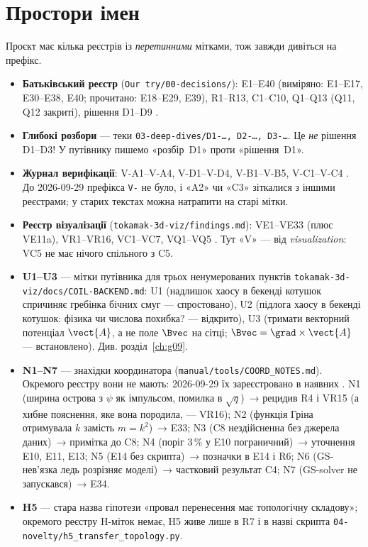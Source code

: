 \section{Простори імен}\label{sec:g00-ids}

Проєкт має кілька реєстрів із \emph{перетинними} мітками, тож завжди дивіться на префікс.
\begin{itemize}
\item \textbf{Батьківський реєстр} (\texttt{Our try/00-decisions/}): E1--E40 (виміряно:
  E1--E17, E30--E38, E40; прочитано: E18--E29, E39), R1--R13, C1--C10, Q1--Q13 (Q11, Q12 закриті),
  рішення D1--D9 \cite{RegEst,RegConj,RegQ,RegDec}.
\item \textbf{Глибокі розбори} --- теки \texttt{03-deep-dives/D1-\ldots, D2-\ldots, D3-\ldots}.
  Це \emph{не} рішення D1--D3! У путівнику пишемо «розбір~D1» проти «рішення~D1».
\item \textbf{Журнал верифікації}: V-A1--V-A4, V-D1--V-D4, V-B1--V-B5, V-C1--V-C4
  \cite{RegVerif}. До 2026-09-29 префікса \texttt{V-} не було, і «A2» чи «C3» зіткалися з
  іншими реєстрами; у старих текстах можна натрапити на старі мітки.
\item \textbf{Реєстр візуалізації} (\texttt{tokamak-3d-viz/\allowbreak findings.md}): VE1--VE33 (плюс
  VE11a), VR1--VR16, VC1--VC7, VQ1--VQ5 \cite{RegViz}. Тут «V» --- від
  \emph{visualization}: VC5 не має нічого спільного з C5.
\item \textbf{U1--U3} --- мітки путівника для трьох ненумерованих пунктів
  \texttt{tokamak-3d-viz/\allowbreak docs/\allowbreak COIL-BACKEND.md}: U1 (надлишок хаосу в
  бекенді котушок спричиняє гребінка бічних смуг --- спростовано), U2 (підлога хаосу в бекенді
  котушок: фізика чи числова похибка? --- відкрито), U3 (тримати векторний потенціал $\vect{A}$, а не поле $\Bvec$ на сітці;
  $\Bvec=\grad\times\vect{A}$ --- встановлено). Див.
  розділ~\ref{ch:g09}.
\item \textbf{N1--N7} --- знахідки координатора (\texttt{manual/\allowbreak tools/\allowbreak COORD\_NOTES.md}).
  Окремого реєстру вони не мають: 2026-09-29 їх зареєстровано в наявних \cite{RegLog}.
  N1 (ширина острова з $\psi$ як імпульсом, помилка в $\sqrt q$)~→ рецидив R4 і VR15 (а
  хибне пояснення, яке вона породила, --- VR16); N2 (функція Гріна отримувала $k$ замість
  $m=k^2$)~→ E33; N3 (C8 нездійсненна без джерела даних)~→ примітка до C8; N4 (поріг
  3\,\% у E10 пограничний)~→ уточнення E10, E11, E13; N5 (E14 без скрипта)~→ позначки в
  E14 і R6; N6 (GS-нев'язка ледь розрізняє моделі)~→ частковий результат C4; N7
  (GS-solver не запускався)~→ E34.
\item \textbf{H5} --- стара назва гіпотези «провал перенесення має топологічну складову»;
  окремого реєстру H-міток немає, H5 живе лише в R7 і в назві скрипта
  \texttt{04-novelty/\allowbreak h5\_transfer\_topology.py}.
\end{itemize}

